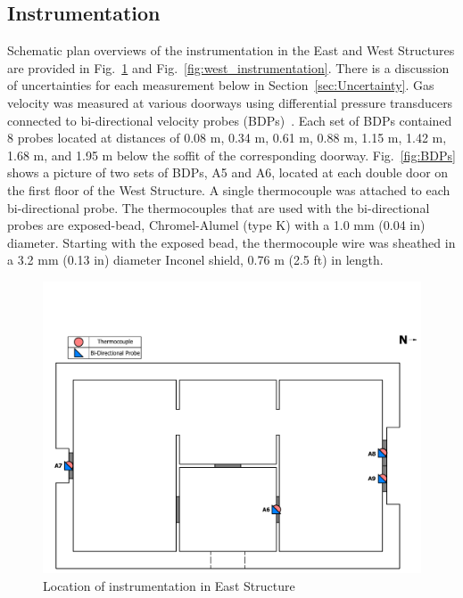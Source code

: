 \documentclass[12pt,oneside]{book}
\begin{document}
\subsection{Instrumentation}
\label{sec:Instrumentation}
Schematic plan overviews of the instrumentation in the East and West Structures are provided in Fig.~\ref{fig:east_instrumentation} and Fig.~\ref{fig:west_instrumentation}. There is a discussion of uncertainties for each measurement below in Section~\ref{sec:Uncertainty}. Gas velocity was measured at various doorways using differential pressure transducers connected to bi-directional velocity probes (BDPs)~\cite{McCaffrey:Combustion_and_Flame}. Each set of BDPs contained 8 probes located at distances of 0.08 m, 0.34 m, 0.61 m, 0.88 m, 1.15 m, 1.42 m, 1.68 m, and 1.95 m below the soffit of the corresponding doorway. Fig.~\ref{fig:BDPs} shows a picture of two sets of BDPs, A5 and A6, located at each double door on the first floor of the West Structure. A single thermocouple was attached to each bi-directional probe. The thermocouples that are used with the bi-directional probes are exposed-bead, Chromel-Alumel (type K) with a 1.0 mm (0.04 in) diameter. Starting with the exposed bead, the thermocouple wire was sheathed in a 3.2 mm (0.13 in) diameter Inconel shield, 0.76 m (2.5 ft) in length.

\begin{figure}[!ht]
\includegraphics[trim=0cm 0cm 0.25cm 3.75cm, clip=true, width=6in]{../Drawings/Instrumentation/East_Structure_Devices_Hose_Test}
\caption[Location of Instrumentation in East Structure]{Location of instrumentation in East Structure}
\label{fig:east_instrumentation}
\end{figure}
\end{document}
